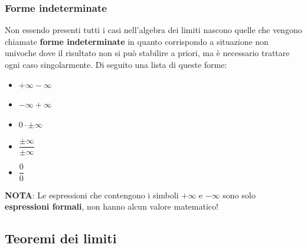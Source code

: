 \subsubsection{Forme indeterminate}
Non essendo presenti tutti i casi nell'algebra dei limiti nascono quelle che vengono chiamate \textbf{forme indeterminate} in quanto corrispondo a situazione non univoche dove il risultato non si può stabilire a priori, ma è necessario trattare ogni caso singolarmente. Di seguito una lista di queste forme:
\begin{itemize}
    \item $+\infty - \infty$
    \item $-\infty + \infty$
    \item $0 \cdot \pm \infty $
    \item $\dfrac{\pm \infty}{\pm \infty}$
    \item $\dfrac{0}{0}$
\end{itemize}

\textbf{NOTA}: Le espressioni che contengono i simboli $+\infty$ e $-\infty$ sono solo \textbf{espressioni formali}, non hanno alcun valore matematico!

\subsection{Teoremi dei limiti}



